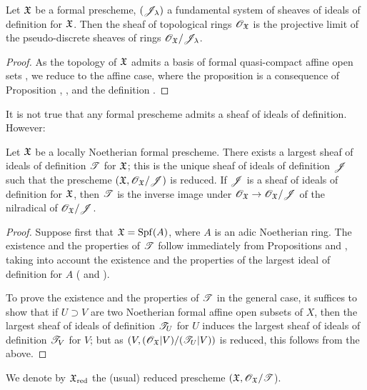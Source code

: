 \begin{prop}[10.5.3]
\label{1.10.5.3}
Let $\mathfrak{X}$ be a formal prescheme, $(\mathscr{J}_\lambda)$ a fundamental system of sheaves of ideals of definition for $\mathfrak{X}$.
Then the sheaf of topological rings $\mathscr{O}_\mathfrak{X}$ is the projective limit of the pseudo-discrete sheaves of rings  $\mathscr{O}_\mathfrak{X}/\mathscr{J}_\lambda$.
\end{prop}

\begin{proof}
\label{proof-1.10.5.3}
As the topology of $\mathfrak{X}$ admits a basis of formal quasi-compact affine open sets , we reduce to the affine case, where the proposition is a consequence of Proposition , , and the definition .
\end{proof}

It is not true that any formal prescheme admits a sheaf of ideals of definition.
However:
\begin{prop}[10.5.4]
\label{1.10.5.4}
Let $\mathfrak{X}$ be a locally Noetherian formal prescheme.
There exists a largest sheaf of ideals of definition $\mathscr{T}$ for $\mathfrak{X}$; this is the unique sheaf of ideals of definition $\mathscr{J}$ such that the prescheme $(\mathfrak{X},\mathscr{O}_\mathfrak{X}/\mathscr{J})$ is reduced.
If $\mathscr{J}$ is a sheaf of ideals of definition for $\mathfrak{X}$, then $\mathscr{T}$ is the inverse image under $\OO_\fk{X}\to\OO_\fk{X}/\sh{J}$ of the nilradical of $\mathscr{O}_\mathfrak{X}/\mathscr{J}$.
\end{prop}

\begin{proof}
\label{proof-1.10.5.4}
Suppose first that $\mathfrak{X}={\mathop{\mathrm{Spf}}\nolimits}(A)$, where $A$ is an adic Noetherian ring.
The existence and the properties of $\mathscr{T}$ follow immediately from Propositions  and , taking into account the existence and the properties of the largest ideal of definition for $A$ ( and ).

To prove the existence and the properties of $\mathscr{T}$ in the general case, it suffices to show that if $U\supset V$ are two Noetherian formal affine open subsets of $X$, then the largest sheaf of ideals of definition $\mathscr{T}_U$ for $U$ induces the largest sheaf of ideals of definition $\mathscr{T}_V$ for $V$; but as $(V,(\mathscr{O}_\mathfrak{X}|V)/(\mathscr{T}_U|V))$ is reduced, this follows from the above.
\end{proof}

We denote by $\mathfrak{X}_\text{red}$ the (usual) reduced prescheme $(\mathfrak{X},\mathscr{O}_\mathfrak{X}/\mathscr{T}$).

